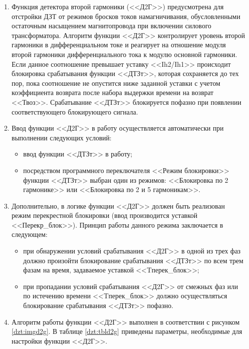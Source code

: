 \documentclass[a4paper, 12pt,table, hidelinks, DIV=calc]{extarticle} %
\begin{document}
\begin{enumerate}[label=\arabic{section}.\arabic{subsection}.\arabic{enumi}, labelsep=4pt, leftmargin=0pt, itemindent=57pt, itemsep=0pt, parsep=5pt]
\begin{enumerate}[label=\arabic{section}.\arabic{subsection}.\arabic{enumi}.\arabic*, labelsep=4pt, leftmargin=0em, itemindent=65pt, parsep=0pt]
\item
Функция детектора второй гармоники (<<Д2Г>>) предусмотрена для отстройки ДЗТ от режимов бросков токов намагничивания, обусловленными остаточным насыщением магнитопровода при включении силового трансформатора. Алгоритм функции <<Д2Г>> контролирует уровень второй гармоники в дифференциальном токе и реагирует на отношение модуля второй гармоники дифференциального тока к модулю основной гармоники. Если данное соотношение превышает уставку <<Ih2/Ih1>> происходит блокировка срабатывания функции <<ДТЗт>>, которая сохраняется до тех пор, пока соотношение не опустится ниже заданной уставки с учетом коэффициента возврата после набора выдержки времени на возврат <<Твоз>>. Срабатывание <<ДТЗт>> блокируется пофазно при появлении соответствующего блокирующего сигнала. 
\item
Ввод функции <<Д2Г>> в работу осуществляется автоматически при выполнении следующих условий:
\begin{itemize}
\item ввод функции <<ДТЗт>> в работу; 
\item\sloppy посредством программного переключателя <<Режим блокировки>> функции <<ДТЗт>> выбран один из режимов: <<Блокировка по 2 гармонике>> или <<Блокировка по 2 и 5 гармоникам>>.
\end{itemize}
\item
Дополнительно, в логике функции <<Д2Г>> должен быть реализован режим перекрестной блокировки (ввод производится уставкой <<Перекр\_блок>>). Принцип работы данного режима заключается в следующем:
\begin{itemize}
\item при обнаружении условий срабатывания <<Д2Г>> в одной из трех фаз должно произойти блокирование срабатывания <<ДТЗт>> по всем трем фазам на время, задаваемое уставкой <<Tперек\_блок>>;
\item при пропадании условий срабатывания <<Д2Г>> от смежных фаз или по истечению времени <<Tперек\_блок>> должно осуществляться блокирование срабатывания <<ДТЗт>> пофазно.
\end{itemize}
\item
Алгоритм работы функции <<Д2Г>> выполнен в соответствии с рисунком \ref{dzt:imgd2g}. В таблице \ref{dzt:tbld2g} приведены параметры, необходимые для настройки функции <<Д2Г>>. 


\end{enumerate}
\end{enumerate}
\end{document}
